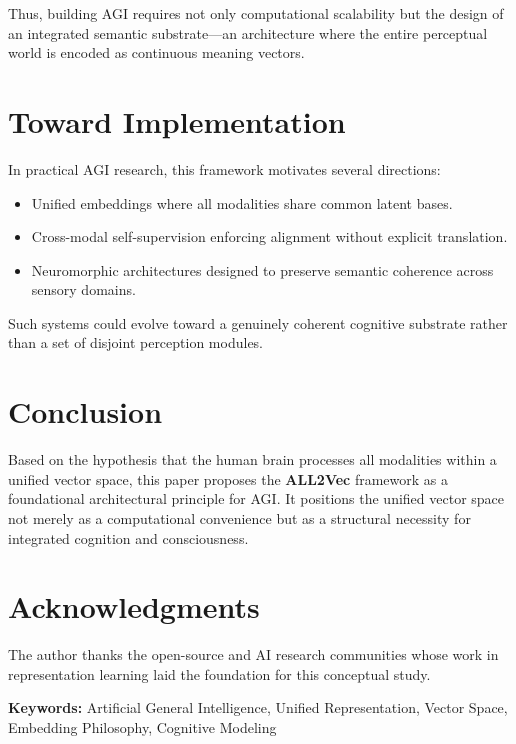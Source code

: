 \documentclass[11pt]{article}
\begin{document}
Thus, building AGI requires not only computational scalability but the design of an integrated semantic substrate—an architecture where the entire perceptual world is encoded as continuous meaning vectors.

\section{Toward Implementation}
In practical AGI research, this framework motivates several directions:
\begin{itemize}
    \item Unified embeddings where all modalities share common latent bases.
    \item Cross-modal self-supervision enforcing alignment without explicit translation.
    \item Neuromorphic architectures designed to preserve semantic coherence across sensory domains.
\end{itemize}

Such systems could evolve toward a genuinely coherent cognitive substrate rather than a set of disjoint perception modules.

\section{Conclusion}
Based on the hypothesis that the human brain processes all modalities within a unified vector space, this paper proposes the \textbf{ALL2Vec} framework as a foundational architectural principle for AGI. It positions the unified vector space not merely as a computational convenience but as a structural necessity for integrated cognition and consciousness.

\section*{Acknowledgments}
The author thanks the open-source and AI research communities whose work in representation learning laid the foundation for this conceptual study.

\vspace{1em}
\noindent\textbf{Keywords:} Artificial General Intelligence, Unified Representation, Vector Space, Embedding Philosophy, Cognitive Modeling
\end{document}
